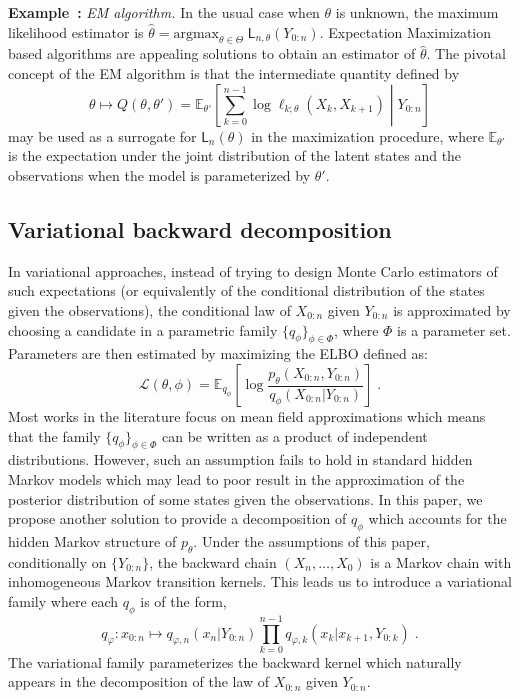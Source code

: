 \documentclass{article}
\newcommand{\1}{\mathbbm{1}}
\newcommand{\llh}[1]{\mathsf{L}_{#1}}
\newcommand{\parvec}{\theta}
\newcommand{\parspace}{\Theta}
\def\pE{\mathbb{E}}
\newcommand{\eqsp}{\;}
\newcommand{\qg}[1]{\ell_{#1}}
\newcounter{example}[section]
\newenvironment{example}[1][]{\refstepcounter{example}\par\medskip
   \noindent \textbf{Example~\theexample:} \textit{#1} \text \rmfamily}{\medskip}
\begin{document}
\begin{example}[EM algorithm.]
\label{ex:em:algorithm}
In the usual case when $\theta$ is unknown, the maximum likelihood estimator is $\widehat \parvec = \mathrm{argmax}_{\parvec\in\parspace}\eqsp\llh{n,\parvec}(Y_{0:n})$. Expectation Maximization based algorithms are appealing solutions to obtain an estimator of $\hat \parvec$.
The pivotal concept of the EM algorithm is that the intermediate quantity defined by
\begin{equation*}
\parvec\mapsto Q(\parvec,\parvec') = \pE_{\parvec'}\left[\sum_{k=0}^{n-1} \log \qg{k;\parvec}(X_{k}, X_{k+1})\middle | Y_{0:n}\right] 
\end{equation*}
may be used as a surrogate for $\llh{n}(\parvec)$ in the maximization procedure,  where $\pE_{\parvec'}$ is the expectation under the joint distribution of the latent states and the observations when the model is parameterized by $\parvec'$. 
\end{example}

\subsection{Variational backward decomposition}
In variational approaches, instead of trying to design Monte Carlo estimators of such expectations (or equivalently of the conditional distribution of the states given the observations), the conditional law of $X_{0:n}$ given $Y_{0:n}$ is approximated by choosing a candidate in a parametric family $\{q_\phi\}_{\phi \in \Phi}$, where $\Phi$ is a parameter set. Parameters are then estimated by maximizing the ELBO defined as:
$$
\mathcal{L}(\parvec,\phi) = \pE_{q_\phi}\left[\log \frac{p_\parvec(X_{0:n},Y_{0:n})}{q_\phi(X_{0:n}|Y_{0:n})}\right]\eqsp.
$$
Most works in the literature focus on mean field approximations which means that the family $\{q_\phi\}_{\phi \in \Phi}$ can be written as a product of independent distributions. However, such an assumption fails to hold in standard hidden Markov models which may lead to poor result in the approximation of the posterior distribution of some states given the observations. In this paper, we propose another solution to provide a decomposition of   $q_\phi$ which accounts for the hidden Markov structure of $p_\parvec$. Under the assumptions of this paper, conditionally on $\{Y_{0:n}\}$, the backward chain $(X_n,\ldots,X_0)$ is a Markov chain with inhomogeneous Markov transition kernels. This leads us to introduce a variational family where each $q_\phi$ is of the form,
$$
q_\varphi: x_{0:n} \mapsto q_{\varphi,n}(x_n|Y_{0:n})\prod_{k=0}^{n-1}q_{\varphi,k}(x_k|x_{k+1},Y_{0:k})\eqsp.
$$
The variational family parameterizes the backward kernel which naturally appears in the decomposition of the law of $X_{0:n}$ given $Y_{0:n}$. 
\end{document}
